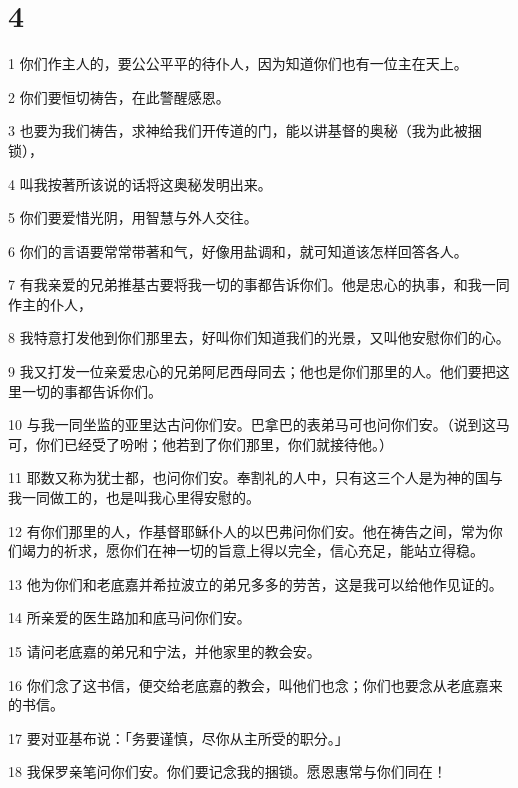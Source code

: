 \chapter{4}

\par 1 你们作主人的，要公公平平的待仆人，因为知道你们也有一位主在天上。
\par 2 你们要恒切祷告，在此警醒感恩。
\par 3 也要为我们祷告，求神给我们开传道的门，能以讲基督的奥秘（我为此被捆锁），
\par 4 叫我按著所该说的话将这奥秘发明出来。
\par 5 你们要爱惜光阴，用智慧与外人交往。
\par 6 你们的言语要常常带著和气，好像用盐调和，就可知道该怎样回答各人。
\par 7 有我亲爱的兄弟推基古要将我一切的事都告诉你们。他是忠心的执事，和我一同作主的仆人，
\par 8 我特意打发他到你们那里去，好叫你们知道我们的光景，又叫他安慰你们的心。
\par 9 我又打发一位亲爱忠心的兄弟阿尼西母同去；他也是你们那里的人。他们要把这里一切的事都告诉你们。
\par 10 与我一同坐监的亚里达古问你们安。巴拿巴的表弟马可也问你们安。（说到这马可，你们已经受了吩咐；他若到了你们那里，你们就接待他。）
\par 11 耶数又称为犹士都，也问你们安。奉割礼的人中，只有这三个人是为神的国与我一同做工的，也是叫我心里得安慰的。
\par 12 有你们那里的人，作基督耶稣仆人的以巴弗问你们安。他在祷告之间，常为你们竭力的祈求，愿你们在神一切的旨意上得以完全，信心充足，能站立得稳。
\par 13 他为你们和老底嘉并希拉波立的弟兄多多的劳苦，这是我可以给他作见证的。
\par 14 所亲爱的医生路加和底马问你们安。
\par 15 请问老底嘉的弟兄和宁法，并他家里的教会安。
\par 16 你们念了这书信，便交给老底嘉的教会，叫他们也念；你们也要念从老底嘉来的书信。
\par 17 要对亚基布说：「务要谨慎，尽你从主所受的职分。」
\par 18 我保罗亲笔问你们安。你们要记念我的捆锁。愿恩惠常与你们同在！


